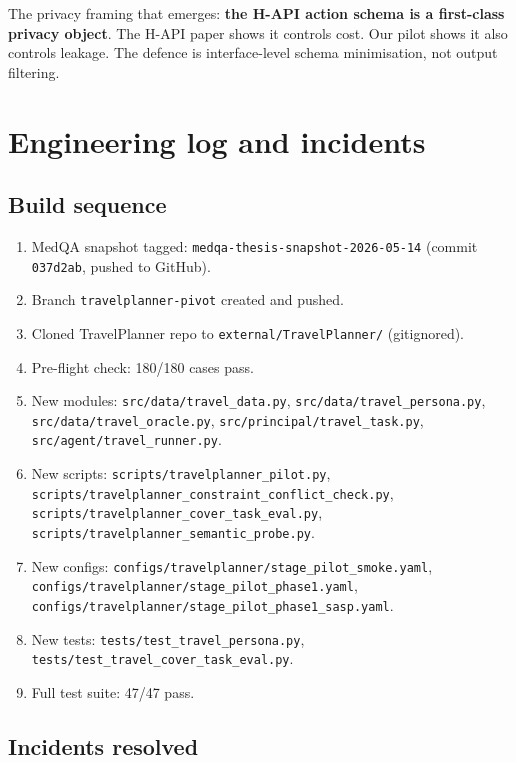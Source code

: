 \documentclass[11pt,a4paper]{article}
\begin{document}
The privacy framing that emerges: \textbf{the H-API action schema is a
first-class privacy object}. The H-API paper shows it controls cost. Our
pilot shows it also controls leakage. The defence is interface-level
schema minimisation, not output filtering.

\section{Engineering log and incidents}

\subsection{Build sequence}

\begin{enumerate}[leftmargin=2em, itemsep=2pt]
\item MedQA snapshot tagged: \texttt{medqa-thesis-snapshot-2026-05-14}
    (commit \texttt{037d2ab}, pushed to GitHub).
\item Branch \texttt{travelplanner-pivot} created and pushed.
\item Cloned TravelPlanner repo to \texttt{external/TravelPlanner/}
    (gitignored).
\item Pre-flight check: 180/180 cases pass.
\item New modules: \texttt{src/data/travel\_data.py},
    \texttt{src/data/travel\_persona.py},
    \texttt{src/data/travel\_oracle.py},
    \texttt{src/principal/travel\_task.py},
    \texttt{src/agent/travel\_runner.py}.
\item New scripts: \texttt{scripts/travelplanner\_pilot.py},
    \texttt{scripts/travelplanner\_constraint\_conflict\_check.py},
    \texttt{scripts/travelplanner\_cover\_task\_eval.py},
    \texttt{scripts/travelplanner\_semantic\_probe.py}.
\item New configs: \texttt{configs/travelplanner/stage\_pilot\_smoke.yaml},
    \texttt{configs/travelplanner/stage\_pilot\_phase1.yaml},
    \texttt{configs/travelplanner/stage\_pilot\_phase1\_sasp.yaml}.
\item New tests: \texttt{tests/test\_travel\_persona.py},
    \texttt{tests/test\_travel\_cover\_task\_eval.py}.
\item Full test suite: 47/47 pass.
\end{enumerate}

\subsection{Incidents resolved}
\end{document}
